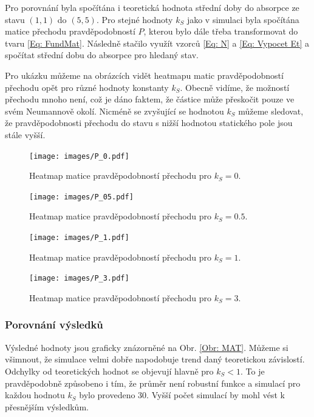 \documentclass[a4paper, 12pt, fleqn]{article}
\begin{document}
	Pro porovnání byla spočítána i teoretická hodnota střední doby do absorpce ze stavu $(1,1)$ do $(5,5)$. Pro stejné hodnoty $k_S$ jako v simulaci byla spočítána matice přechodu pravděpodobností $P$, kterou bylo dále třeba transformovat do tvaru \eqref{Eq: FundMat}. Následně stačilo využít vzorců \eqref{Eq: N} a \eqref{Eq: Vypocet Et} a spočítat střední dobu do absorpce pro hledaný stav.
	
	Pro ukázku můžeme na obrázcích  vidět heatmapu matic pravděpodobností přechodu opět pro různé hodnoty konstanty $k_S$. Obecně vidíme, že možností přechodu mnoho není, což je dáno faktem, že částice může přeskočit pouze ve svém Neumannově okolí. Nicméně se zvyšující se hodnotou $k_S$ můžeme sledovat, že pravděpodobnosti přechodu do stavu s nižší hodnotou statického pole jsou stále vyšší.
	
	\begin{figure}[h]
		\centering
		\texttt{[image: images/P\_0.pdf]}
		\caption{Heatmap matice pravděpodobností přechodu pro $k_S = 0$.}
		\label{Obr: P0}
	\end{figure}
	
	\begin{figure}
		\centering
		\texttt{[image: images/P\_05.pdf]}
		\caption{Heatmap matice pravděpodobností přechodu pro $k_S = 0.5$.}
		\label{Obr: P05}
	\end{figure}
	
	\begin{figure}
		\centering
		\texttt{[image: images/P\_1.pdf]}
		\caption{Heatmap matice pravděpodobností přechodu pro $k_S = 1$.}
		\label{Obr: P1}
	\end{figure}
	
	\begin{figure}
		\centering
		\texttt{[image: images/P\_3.pdf]}
		\caption{Heatmap matice pravděpodobností přechodu pro $k_S = 3$.}
		\label{Obr: P3}
	\end{figure}
	
	\pagebreak
	\subsubsection{Porovnání výsledků}
	
	Výsledné hodnoty jsou graficky znázorněné na Obr. \ref{Obr: MAT}.  Můžeme si všimnout, že simulace velmi dobře napodobuje trend daný teoretickou závislostí. Odchylky od teoretických hodnot se objevují hlavně pro $k_S < 1$. To je pravděpodobně způsobeno i tím, že průměr není robustní funkce a simulací pro každou hodnotu $k_S$ bylo provedeno 30. Vyšší počet simulací by mohl vést k přesnějším výsledkům.
	
\end{document}
